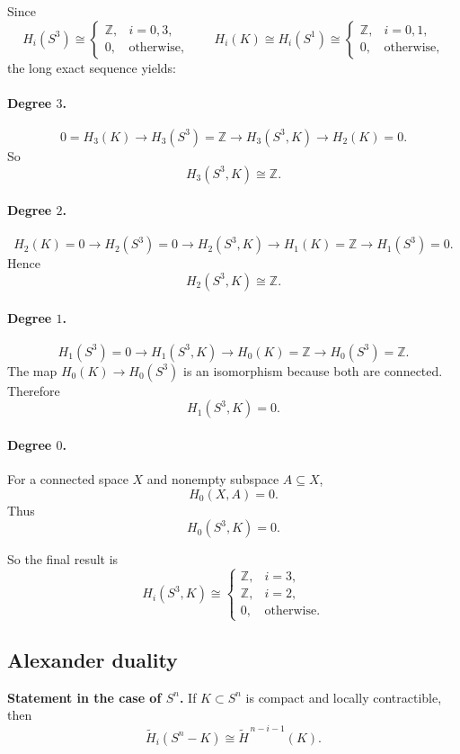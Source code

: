 \documentclass[12pt,a4paper]{article}
\theoremstyle{notespace}
\begin{document}
Since
\[
H_i(S^3)\cong
\begin{cases}
	\mathbb Z, & i=0,3,\\
	0, & \text{otherwise},
\end{cases}
\qquad
H_i(K)\cong H_i(S^1)\cong
\begin{cases}
	\mathbb Z, & i=0,1,\\
	0, & \text{otherwise},
\end{cases}
\]
the long exact sequence yields:

\paragraph{Degree \(3\).}
\[
0=H_3(K)\to H_3(S^3)=\mathbb Z\to H_3(S^3,K)\to H_2(K)=0.
\]
So
\[
H_3(S^3,K)\cong \mathbb Z.
\]

\paragraph{Degree \(2\).}
\[
H_2(K)=0\to H_2(S^3)=0\to H_2(S^3,K)\to H_1(K)=\mathbb Z\to H_1(S^3)=0.
\]
Hence
\[
H_2(S^3,K)\cong \mathbb Z.
\]

\paragraph{Degree \(1\).}
\[
H_1(S^3)=0\to H_1(S^3,K)\to H_0(K)=\mathbb Z\to H_0(S^3)=\mathbb Z.
\]
The map \(H_0(K)\to H_0(S^3)\) is an isomorphism because both are connected. Therefore
\[
H_1(S^3,K)=0.
\]

\paragraph{Degree \(0\).}
For a connected space \(X\) and nonempty subspace \(A\subseteq X\),
\[
H_0(X,A)=0.
\]
Thus
\[
H_0(S^3,K)=0.
\]

So the final result is
\[
H_i(S^3,K)\cong
\begin{cases}
	\mathbb Z, & i=3,\\
	\mathbb Z, & i=2,\\
	0, & \text{otherwise}.
\end{cases}
\]

\subsection{Alexander duality}

\textbf{Statement in the case of \(S^n\).}
If \(K\subset S^n\) is compact and locally contractible, then
\[
\widetilde H_i(S^n-K)\cong \widetilde H^{\,n-i-1}(K).
\]
\end{document}
